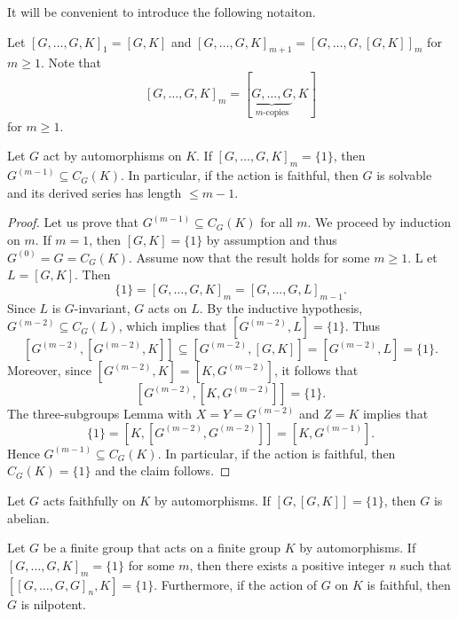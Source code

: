 It will be convenient to introduce the following notaiton. 

Let 
$[G,\dots,G,K]_1 = [G,K]$ and $[G,\dots,G,K]_{m+1}=[G,\dots,G,[G,K]]_m$ for $m\geq 1$. Note that 
\[
[G,\dots,G,K]_{m}=[\underbrace{G,\dots,G}_{\text{$m$-copies}},K]
\] 
for $m\geq 1$.

\begin{theorem}
Let $G$ act by automorphisms on $K$. If $[G,\dots,G,K]_m=\{1\}$, then
$G^{(m-1)}\subseteq  C_G(K)$. In particular, if the action is faithful, 
then $G$ is solvable 
and its derived series has length $\leq m-1$.
\end{theorem}

\begin{proof}
	Let us prove that $G^{(m-1)}\subseteq  C_G(K)$ for all $m$. We proceed by induction on $m$. If $m=1$, then 
	$[G,K]=\{1\}$ by assumption and thus 
	$G^{(0)}=G=C_G(K)$. Assume now that the result holds for some $m\geq1$. L
	et $L=[G,K]$. Then
	\[
	\{1\}=[G,\dots,G,K]_m=[G,\dots,G,L]_{m-1}.
	\]
	Since $L$ is $G$-invariant, $G$ acts on $L$. 
	By the inductive hypothesis, $G^{(m-2)}\subseteq C_G(L)$, which 
	implies that $[G^{(m-2)},L]=\{1\}$. Thus 
	\[
	[G^{(m-2)},[G^{(m-2)},K]]\subseteq [G^{(m-2)},[G,K]]=[G^{(m-2)},L]=\{1\}.
	\]
	Moreover, since $[G^{(m-2)},K]=[K,G^{(m-2)}]$, 
	it follows that 
	\[
	[G^{(m-2)},[K,G^{(m-2)}]]=\{1\}.
	\]
	The three-subgroups Lemma
	with $X=Y=G^{(m-2)}$ and $Z=K$ implies that 
	\[
	\{1\}=[K,[G^{(m-2)},G^{(m-2)}]]=[K,G^{(m-1)}].
	\]  
	Hence $G^{(m-1)}\subseteq C_G(K)$. In particular, if the action is faithful, 
	then $C_G(K)=\{1\}$ and the claim follows. 
\end{proof}

\begin{exercise}
Let $G$ acts faithfully on $K$ by automorphisms. If $[G,[G,K]]=\{1\}$, then $G$ is abelian. 	
\end{exercise}

\begin{theorem}[Hall]
	Let $G$ be a finite group that acts on a finite group $K$ by automorphisms. 
	If $[G,\dots,G,K]_m=\{1\}$ for some $m$, then there exists a positive integer $n$ such that $[[G,\dots,G,G]_n,K]=\{ 1\}$. Furthermore, if the action of $G$ on $K$ is faithful, then $G$ is nilpotent. 
\end{theorem}

